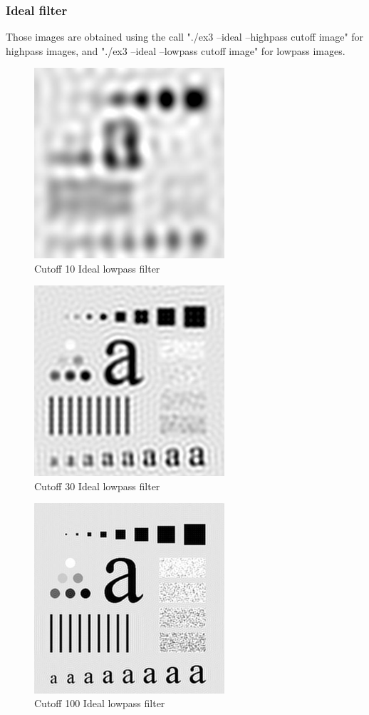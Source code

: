 \documentclass[10pt]{article}
\begin{document}
\subsubsection{Ideal filter}
Those images are obtained using the call "./ex3 --ideal --highpass cutoff image" for highpass images, and "./ex3 --ideal --lowpass cutoff image" for lowpass images.
\begin{figure}[!ht]
	\centering
	\includegraphics[height=200pt]{./ex3/ch_ideal_low_10.jpg}
	\caption{Cutoff 10 Ideal lowpass filter}
\end{figure}
\begin{figure}[!ht]
	\centering
	\includegraphics[height=200pt]{./ex3/ch_ideal_low_30.jpg}
	\caption{Cutoff 30 Ideal lowpass filter}
\end{figure}
\begin{figure}[!ht]
	\centering
	\includegraphics[height=200pt]{./ex3/ch_ideal_low_100.jpg}
	\caption{Cutoff 100 Ideal lowpass filter}
\end{figure}
\end{document}
